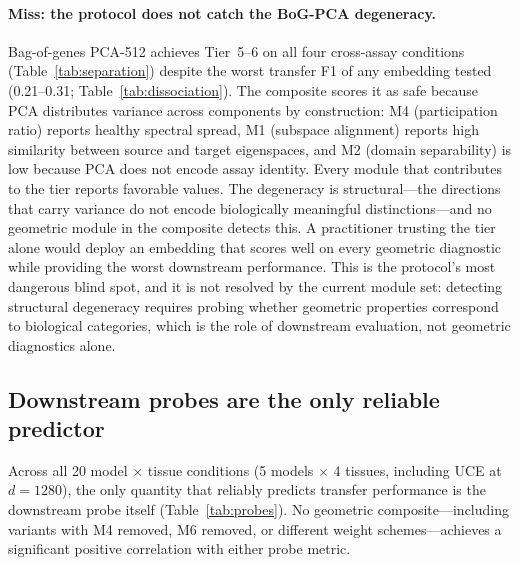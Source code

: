 \documentclass[9pt,lineno]{elife}
\begin{document}
\paragraph{Miss: the protocol does not catch the BoG-PCA degeneracy.} Bag-of-genes PCA-512 achieves Tier~5--6 on all four cross-assay conditions (Table~\ref{tab:separation}) despite the worst transfer F1 of any embedding tested (0.21--0.31; Table~\ref{tab:dissociation}). The composite scores it as safe because PCA distributes variance across components by construction: M4 (participation ratio) reports healthy spectral spread, M1 (subspace alignment) reports high similarity between source and target eigenspaces, and M2 (domain separability) is low because PCA does not encode assay identity. Every module that contributes to the tier reports favorable values. The degeneracy is structural---the directions that carry variance do not encode biologically meaningful distinctions---and no geometric module in the composite detects this. A practitioner trusting the tier alone would deploy an embedding that scores well on every geometric diagnostic while providing the worst downstream performance. This is the protocol's most dangerous blind spot, and it is not resolved by the current module set: detecting structural degeneracy requires probing whether geometric properties correspond to biological categories, which is the role of downstream evaluation, not geometric diagnostics alone.

\subsection{Downstream probes are the only reliable predictor}

Across all 20 model $\times$ tissue conditions (5 models $\times$ 4 tissues, including UCE at $d = 1280$), the only quantity that reliably predicts transfer performance is the downstream probe itself (Table~\ref{tab:probes}). No geometric composite---including variants with M4 removed, M6 removed, or different weight schemes---achieves a significant positive correlation with either probe metric.
\end{document}
